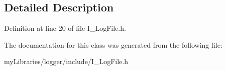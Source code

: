 \subsection{Detailed Description}


Definition at line 20 of file I\+\_\+\+Log\+File.\+h.



The documentation for this class was generated from the following file\+:\begin{DoxyCompactItemize}
\item 
my\+Libraries/logger/include/I\+\_\+\+Log\+File.\+h\end{DoxyCompactItemize}
